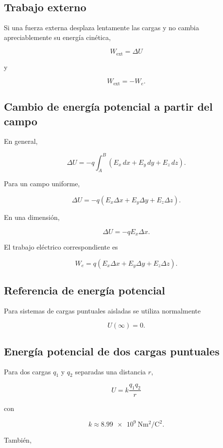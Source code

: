 \subsection{Trabajo externo}

Si una fuerza externa desplaza lentamente las cargas y no cambia apreciablemente
su energía cinética,

\[
\boxed{
W_{\text{ext}}=\Delta U
}
\]

y

\[
\boxed{
W_{\text{ext}}=-W_e
}.
\]


\subsection{Cambio de energía potencial a partir del campo}

En general,

\[
\boxed{
\Delta U
=
-q\int_A^B
\left(
E_x\,dx+E_y\,dy+E_z\,dz
\right)
}.
\]

Para un campo uniforme,

\[
\boxed{
\Delta U
=
-q
\left(
E_x\Delta x+
E_y\Delta y+
E_z\Delta z
\right)
}.
\]

En una dimensión,

\[
\boxed{
\Delta U=-qE_x\Delta x
}.
\]

El trabajo eléctrico correspondiente es

\[
\boxed{
W_e=
q
\left(
E_x\Delta x+
E_y\Delta y+
E_z\Delta z
\right)
}.
\]


\subsection{Referencia de energía potencial}

Para sistemas de cargas puntuales aisladas se utiliza normalmente

\[
\boxed{
U(\infty)=0
}.
\]


\subsection{Energía potencial de dos cargas puntuales}

Para dos cargas \(q_1\) y \(q_2\) separadas una distancia \(r\),

\[
\boxed{
U=k\frac{q_1q_2}{r}
}
\]

con

\[
\boxed{
k\approx
\SI{8.99e9}{\newton\metre\squared\per\coulomb\squared}
}.
\]

También,

